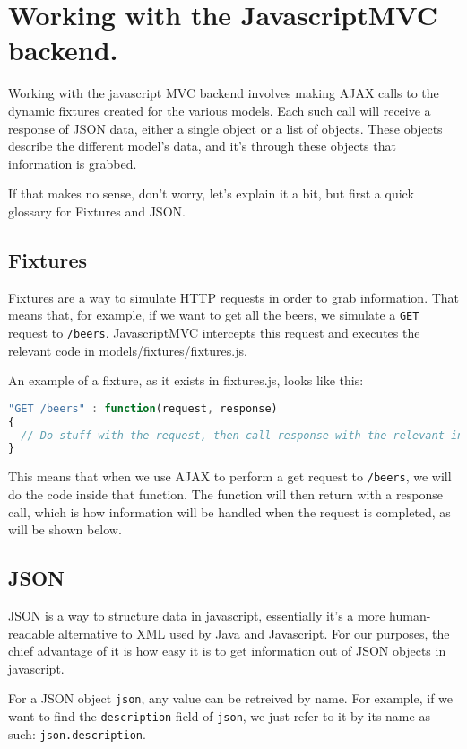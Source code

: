 \documentclass[a4paper]{article}
\begin{document}
\section{Working with the JavascriptMVC backend.}
Working with the javascript MVC backend involves making AJAX calls to the dynamic fixtures created for the various models. 
Each such call will receive a response of JSON data, either a single object or a list of objects. These objects describe the different model's data,
and it's through these objects that information is grabbed.

If that makes no sense, don't worry, let's explain it a bit, but first a quick glossary for Fixtures and JSON.

\subsection{Fixtures}
Fixtures are a way to simulate HTTP requests in order to grab information. That means that, for example, if we want to get all the beers, we simulate a \texttt{GET} request to \texttt{/beers}.
JavascriptMVC intercepts this request and executes the relevant code in models/fixtures/fixtures.js.

An example of a fixture, as it exists in fixtures.js, looks like this:
\begin{lstlisting}[language=javascript, frame=single, showstringspaces = false, basicstyle=\small\ttfamily]
"GET /beers" : function(request, response)
{
  // Do stuff with the request, then call response with the relevant information.
}
\end{lstlisting}
This means that when we use AJAX to perform a get request to \texttt{/beers}, we will do the code inside that function. The function will then
return with a response call, which is how information will be handled when the request is completed, as will be shown below.

\subsection{JSON}
JSON is a way to structure data in javascript, essentially it's a more human-readable alternative to XML used by Java and Javascript.
For our purposes, the chief advantage of it is how easy it is to get information out of JSON objects in javascript.

For a JSON object \texttt{json}, any value can be retreived by name. For example, if we want to find the \texttt{description} field of \texttt{json}, 
we just refer to it by its name as such: \texttt{json.description}.
\end{document}
